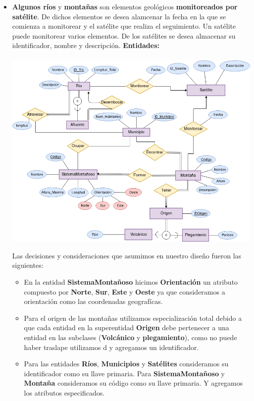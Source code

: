 \documentclass[letterpaper,11pt]{article}
\begin{document}
\begin{itemize}
\begin{itemize}
        \item \textbf{Algunos ríos} y \textbf{montañas} son elementos geológicos
              \textbf{monitoreados por satélite}. De dichos elementos se desea
              alamcenar la fecha en la que se comienza a monitorear y el satélite
              que realiza el seguimiento. Un satélite puede monitorear varios
              elementos. De los satélites se desea almacenar su identificador,
              nombre y descripción.
              \textbf{Entidades:}\\\\
        \includegraphics[width= 15 cm]{imagenes/2b.png}

        Las decisiones y consideraciones que asumimos en nuestro diseño fueron
        las siguientes:
       \begin{itemize}
       \item En la entidad \textbf{SistemaMontañoso} hicimos \textbf{Orientación}
             un atributo compuesto por \textbf{Norte}, \textbf{Sur}, \textbf{Este}
             y \textbf{Oeste} ya que consideramos a orientación como las coordenadas
             geografícas.
       \item Para el origen de las montañas utilizamos especialización total debido
             a que cada entidad en la superentidad \textbf{Origen} debe pertenecer a
             una entidad en las subclases (\textbf{Volcánico} y \textbf{plegamiento}),
             como no puede haber traslape utilizamos d y agregamos un identificador.
       \item Para las entidades \textbf{Ríos}, \textbf{Municipios} y \textbf{Satélites}
             consideramos su identificador como su llave primaria. Para \textbf{SistemaMontañoso}
             y \textbf{Montaña} consideramos su código como su llave primaria. Y agregamos
             los atributos especificados.
       \end{itemize}


\end{itemize}
\end{itemize}
\end{document}

